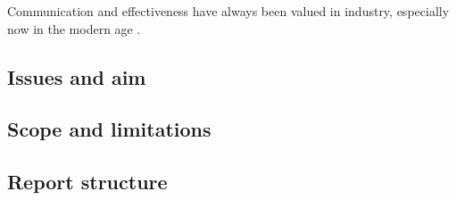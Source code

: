 Communication and effectiveness have always been valued in industry,
especially now in the modern age {\TODOCite}. \\

\subsection{Issues and aim}


\subsection{Scope and limitations}


\subsection{Report structure}

